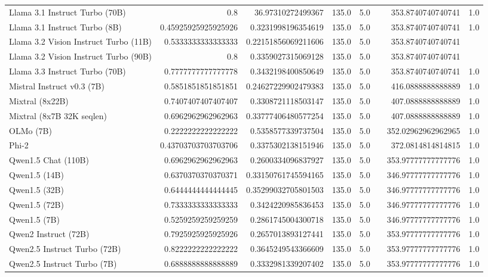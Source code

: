 \begin{table}[htp]
{\begin{tabular}{lrrrrrrr}
Llama 3.1 Instruct Turbo (70B) & 0.8 & 36.97310272499367 & 135.0 & 5.0 &  & 353.8740740740741 & 1.0 \\
Llama 3.1 Instruct Turbo (8B) & 0.45925925925925926 & 0.3231998196354619 & 135.0 & 5.0 &  & 353.8740740740741 & 1.0 \\
Llama 3.2 Vision Instruct Turbo (11B) & 0.5333333333333333 & 0.22151856069211606 & 135.0 & 5.0 &  & 353.8740740740741 &  \\
Llama 3.2 Vision Instruct Turbo (90B) & 0.8 & 0.3359027315069128 & 135.0 & 5.0 &  & 353.8740740740741 &  \\
Llama 3.3 Instruct Turbo (70B) & 0.7777777777777778 & 0.3432198400850649 & 135.0 & 5.0 &  & 353.8740740740741 & 1.0 \\
Mistral Instruct v0.3 (7B) & 0.5851851851851851 & 0.24627229902479383 & 135.0 & 5.0 &  & 416.0888888888889 & 1.0 \\
Mixtral (8x22B) & 0.7407407407407407 & 0.3308721118503147 & 135.0 & 5.0 &  & 407.0888888888889 & 1.0 \\
Mixtral (8x7B 32K seqlen) & 0.6962962962962963 & 0.33777406480577254 & 135.0 & 5.0 &  & 407.0888888888889 & 1.0 \\
OLMo (7B) & 0.2222222222222222 & 0.5358577339737504 & 135.0 & 5.0 &  & 352.02962962962965 & 1.0 \\
Phi-2 & 0.43703703703703706 & 0.3375302138151946 & 135.0 & 5.0 &  & 372.0814814814815 & 1.0 \\
Qwen1.5 Chat (110B) & 0.6962962962962963 & 0.2600334096837927 & 135.0 & 5.0 &  & 353.97777777777776 & 1.0 \\
Qwen1.5 (14B) & 0.6370370370370371 & 0.33150761745594165 & 135.0 & 5.0 &  & 346.97777777777776 & 1.0 \\
Qwen1.5 (32B) & 0.6444444444444445 & 0.35299032705801503 & 135.0 & 5.0 &  & 346.97777777777776 & 1.0 \\
Qwen1.5 (72B) & 0.7333333333333333 & 0.3424220985836453 & 135.0 & 5.0 &  & 346.97777777777776 & 1.0 \\
Qwen1.5 (7B) & 0.5259259259259259 & 0.2861745004300718 & 135.0 & 5.0 &  & 346.97777777777776 & 1.0 \\
Qwen2 Instruct (72B) & 0.7925925925925926 & 0.2657013893127441 & 135.0 & 5.0 &  & 353.97777777777776 & 1.0 \\
Qwen2.5 Instruct Turbo (72B) & 0.8222222222222222 & 0.3645249543366609 & 135.0 & 5.0 &  & 353.97777777777776 & 1.0 \\
Qwen2.5 Instruct Turbo (7B) & 0.6888888888888889 & 0.3332981339207402 & 135.0 & 5.0 &  & 353.97777777777776 & 1.0 \\

\end{tabular}}
\end{table}
